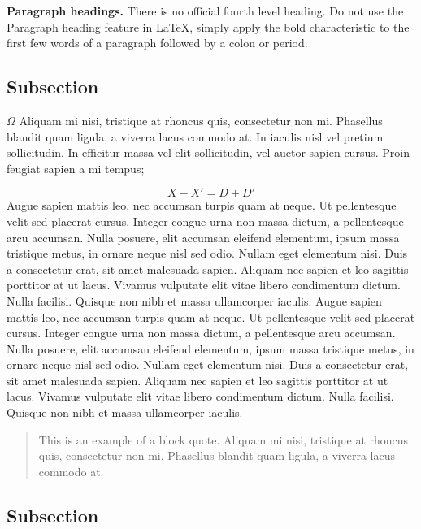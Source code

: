 \documentclass[../main.tex]{subfiles}
\begin{document}
{\bf Paragraph headings.} There is no official fourth level heading. Do not use the Paragraph heading feature in LaTeX, simply apply the bold characteristic to the first few words of a paragraph followed by a colon or period.

\subsection{Subsection}

\(\Omega\) Aliquam mi nisi, tristique at rhoncus quis, consectetur non mi. Phasellus blandit quam ligula, a viverra lacus commodo at. In iaculis nisl vel pretium sollicitudin. In efficitur massa vel elit sollicitudin, vel auctor sapien cursus. Proin feugiat sapien a mi tempus;

\begin{equation}
       X-X'=D+D' 
\end{equation}
Augue sapien mattis leo, nec accumsan turpis quam at neque. Ut pellentesque velit sed
placerat cursus. Integer congue urna non massa dictum, a pellentesque arcu accumsan. Nulla
posuere, elit accumsan eleifend elementum, ipsum massa tristique metus, in ornare neque nisl sed
odio. Nullam eget elementum nisi. Duis a consectetur erat, sit amet malesuada sapien. Aliquam
nec sapien et leo sagittis porttitor at ut lacus. Vivamus vulputate elit vitae libero condimentum
dictum. Nulla facilisi. Quisque non nibh et massa ullamcorper iaculis.
Augue sapien mattis leo, nec accumsan turpis quam at neque. Ut pellentesque velit sed
placerat cursus. Integer congue urna non massa dictum, a pellentesque arcu accumsan. Nulla
posuere, elit accumsan eleifend elementum, ipsum massa tristique metus, in ornare neque nisl sed
odio. Nullam eget elementum nisi. Duis a consectetur erat, sit amet malesuada sapien. Aliquam
nec sapien et leo sagittis porttitor at ut lacus. Vivamus vulputate elit vitae libero condimentum
dictum. Nulla facilisi. Quisque non nibh et massa ullamcorper iaculis.


\begin{quote}
    \begin{singlespace}
  This is an example of a block quote. Aliquam mi nisi, tristique at rhoncus quis, consectetur non mi. Phasellus blandit quam ligula, a viverra lacus commodo at. 
    \end{singlespace}
    
\end{quote}

\subsection{Subsection}
\end{document}
